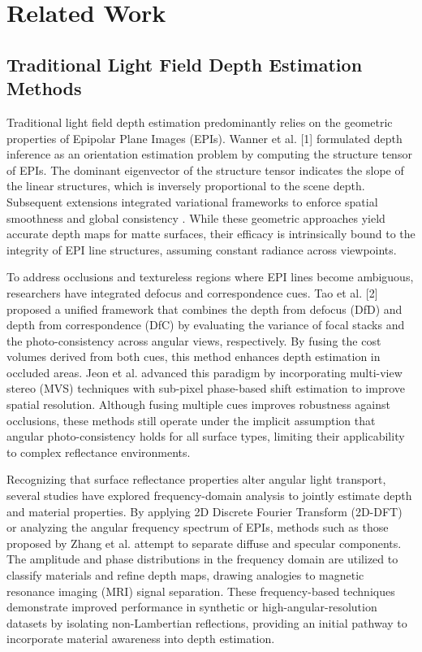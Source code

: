 \section{Related Work}

\subsection{Traditional Light Field Depth Estimation Methods}

Traditional light field depth estimation predominantly relies on the geometric properties of Epipolar Plane Images (EPIs). Wanner et al. [1] formulated depth inference as an orientation estimation problem by computing the structure tensor of EPIs. The dominant eigenvector of the structure tensor indicates the slope of the linear structures, which is inversely proportional to the scene depth. Subsequent extensions integrated variational frameworks to enforce spatial smoothness and global consistency . While these geometric approaches yield accurate depth maps for matte surfaces, their efficacy is intrinsically bound to the integrity of EPI line structures, assuming constant radiance across viewpoints.

To address occlusions and textureless regions where EPI lines become ambiguous, researchers have integrated defocus and correspondence cues. Tao et al. [2] proposed a unified framework that combines the depth from defocus (DfD) and depth from correspondence (DfC) by evaluating the variance of focal stacks and the photo-consistency across angular views, respectively. By fusing the cost volumes derived from both cues, this method enhances depth estimation in occluded areas. Jeon et al. advanced this paradigm by incorporating multi-view stereo (MVS) techniques with sub-pixel phase-based shift estimation to improve spatial resolution. Although fusing multiple cues improves robustness against occlusions, these methods still operate under the implicit assumption that angular photo-consistency holds for all surface types, limiting their applicability to complex reflectance environments.

Recognizing that surface reflectance properties alter angular light transport, several studies have explored frequency-domain analysis to jointly estimate depth and material properties. By applying 2D Discrete Fourier Transform (2D-DFT) or analyzing the angular frequency spectrum of EPIs, methods such as those proposed by Zhang et al. attempt to separate diffuse and specular components. The amplitude and phase distributions in the frequency domain are utilized to classify materials and refine depth maps, drawing analogies to magnetic resonance imaging (MRI) signal separation. These frequency-based techniques demonstrate improved performance in synthetic or high-angular-resolution datasets by isolating non-Lambertian reflections, providing an initial pathway to incorporate material awareness into depth estimation.

